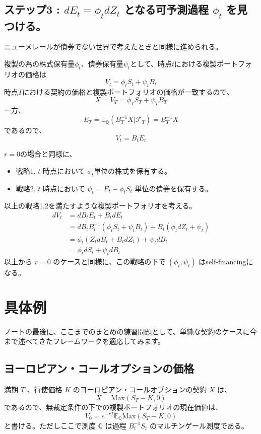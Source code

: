 \documentclass[uplatex,a4j,12pt,dvipdfmx]{jsarticle}
\begin{document}
\subsection{ステップ3 : $dE_{t} = \phi_{t} d Z_{t}$ となる可予測過程 $\phi_{t}$ を見つける。}
ニューメレールが債券でない世界で考えたときと同様に進められる。

複製の為の株式保有量$\phi_{t}$、債券保有量$\psi_{t}$として、時点$t$における複製ポートフォリオの価格は
$$V_{t} = \phi_{t} S_{t} + \psi_{t} B_{t}$$
時点$T$における契約の価格と複製ポートフォリオの価格が一致するので、
$$X = V_{T} = \phi_{T} S_{T} + \psi_{T} B_{T}$$
一方、
$$E_{T} = \mathbb{E}_{\mathbb{Q}}(B^{-1}_{T} X | \mathcal{F}_{T}) = B^{-1}_{T} X$$
であるので、
$$V_{t} = B_{t} E_{t}$$

$r=0$の場合と同様に、
\begin{itemize}
	\item 戦略1. $t$ 時点において $\phi_{t}$単位の株式を保有する。
	\item 戦略2. $t$ 時点において $\psi_{t} = E_{t} - \phi_{t} S_{t}$ 単位の債券を保有する。
\end{itemize}
以上の戦略1,2を満たすような複製ポートフォリオを考える。
\begin{align*}
	d V_{t} & = d B_{t} E_{t} + B_{t} d E_{t}                                                             \\
	        & = d B_{t} B^{-1}_{t} (\phi_{t} S_{t} + \psi_{t} B_{t}) + B_{t} (\phi_{t} dZ_{t} + \psi_{t}) \\
	        & = \phi_{t} (Z_{t} dB_{t} + B_{t} dZ_{t}) + \psi_{t} dB_{t}                                  \\
	        & = \phi_{t} dS_{t} + \psi_{t} dB_{t}
\end{align*}
以上から $r=0$ のケースと同様に、この戦略の下で $(\phi_{t},\psi_{t})$ はself-financingになる。

\section{具体例}
ノートの最後に、ここまでのまとめの練習問題として、単純な契約のケースに今まで述べてきたフレームワークを適応してみます。

\subsection{ヨーロピアン・コールオプションの価格}
満期 $T$ 、行使価格 $K$ のヨーロピアン・コールオプションの契約 $X$ は、
$$ X = \mathrm{Max}(S_{T} - K,0) $$
であるので、無裁定条件の下での複製ポートフォリオの現在価値は、
$$ V_{0} = e^{-rT} \mathbb{E}_{\mathbb{Q}} \mathrm{Max}(S_{T} - K,0) $$
と書ける。ただしここで測度 $\mathbb{Q}$ は過程 $B^{-1}_{t} S_{t}$ のマルチンゲール測度である。
\end{document}
